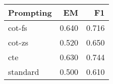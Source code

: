 \begin{tabular}{lrr}
\toprule
Prompting & EM & F1 \\
\midrule
cot-fs & 0.640 & 0.716 \\
cot-zs & 0.520 & 0.650 \\
cte & 0.630 & 0.744 \\
standard & 0.500 & 0.610 \\
\bottomrule
\end{tabular}
